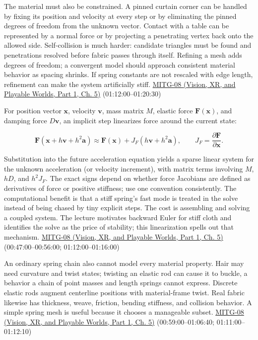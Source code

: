 The material must also be constrained. A pinned curtain corner can be handled by fixing its position and velocity at every step or by eliminating the pinned degrees of freedom from the unknown vector. Contact with a table can be represented by a normal force or by projecting a penetrating vertex back onto the allowed side. Self-collision is much harder: candidate triangles must be found and penetrations resolved before fabric passes through itself. Refining a mesh adds degrees of freedom; a convergent model should approach consistent material behavior as spacing shrinks. If spring constants are not rescaled with edge length, refinement can make the system artificially stiff. \href{../07-Vision-XR-and-Playable-Worlds-P01/main.pdf\#nameddest=04-visual-computing-ii-ch036-mitg-08---cloth-simulation}{MITG-08 (Vision, XR, and Playable Worlds, Part 1, Ch. 5)} (01:12:00--01:20:30)

For position vector \(\boldsymbol{x}\), velocity \(\boldsymbol{v}\), mass matrix \(M\), elastic force \(\boldsymbol{F}(\boldsymbol{x})\), and damping force \(D\boldsymbol{v}\), an implicit step linearizes force around the current state:

\[
\boldsymbol{F}(\boldsymbol{x}+h\boldsymbol{v}+h^2\boldsymbol{a})
\approx \boldsymbol{F}(\boldsymbol{x})
+J_F(h\boldsymbol{v}+h^2\boldsymbol{a}),
\qquad J_F=\frac{\partial \boldsymbol{F}}{\partial \boldsymbol{x}}.
\]

Substitution into the future acceleration equation yields a sparse linear system for the unknown acceleration (or velocity increment), with matrix terms involving \(M\), \(hD\), and \(h^2J_F\). The exact signs depend on whether force Jacobians are defined as derivatives of force or positive stiffness; use one convention consistently. The computational benefit is that a stiff spring's fast mode is treated in the solve instead of being chased by tiny explicit steps. The cost is assembling and solving a coupled system. The lecture motivates backward Euler for stiff cloth and identifies the solve as the price of stability; this linearization spells out that mechanism. \href{../07-Vision-XR-and-Playable-Worlds-P01/main.pdf\#nameddest=04-visual-computing-ii-ch036-mitg-08---cloth-simulation}{MITG-08 (Vision, XR, and Playable Worlds, Part 1, Ch. 5)} (00:47:00--00:56:00; 01:12:00--01:16:00)

An ordinary spring chain also cannot model every material property. Hair may need curvature and twist states; twisting an elastic rod can cause it to buckle, a behavior a chain of point masses and length springs cannot express. Discrete elastic rods augment centerline positions with material-frame twist. Real fabric likewise has thickness, weave, friction, bending stiffness, and collision behavior. A simple spring mesh is useful because it chooses a manageable subset. \href{../07-Vision-XR-and-Playable-Worlds-P01/main.pdf\#nameddest=04-visual-computing-ii-ch036-mitg-08---cloth-simulation}{MITG-08 (Vision, XR, and Playable Worlds, Part 1, Ch. 5)} (00:59:00--01:06:40; 01:11:00--01:12:10)

